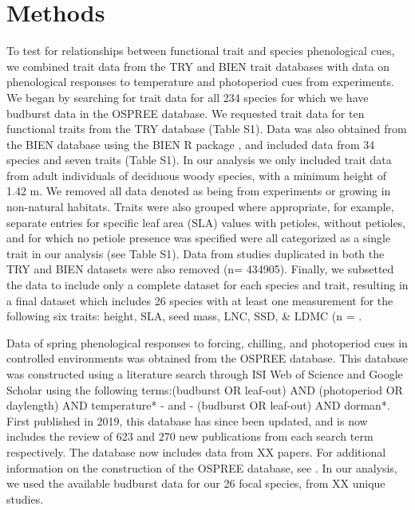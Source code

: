\documentclass{article}\usepackage[]{graphicx}\usepackage[]{color}
\begin{document}
\section{Methods}
To test for relationships between functional trait and species phenological cues, we combined trait data from the TRY and BIEN trait databases with data on phenological responses to temperature and photoperiod cues from experiments. We began by searching for trait data for all 234 species for which we have budburst data in the OSPREE database. We requested trait data for ten functional traits from the TRY database (Table S1). Data was also obtained from the BIEN database using the BIEN R package \citep{Maitner2017}, and included data from 34 species and seven traits (Table S1). In our analysis we only included trait data from adult individuals of deciduous woody species, with a minimum height of 1.42 m. We removed all data denoted as being from experiments or growing in non-natural habitats. Traits were also grouped where appropriate, for example, separate entries for specific leaf area (SLA) values with petioles, without petioles, and for which no petiole presence was specified were all categorized as a single trait in our analysis (see Table S1). Data from studies duplicated in both the TRY and BIEN datasets were also removed (n= 434905).  Finally, we subsetted the data to include only a complete dataset for each species and trait, resulting in a final dataset which includes 26 species with at least one measurement for the following six traits: height, SLA, seed mass, LNC, SSD, \& LDMC (n = . %

Data of spring phenological responses to forcing, chilling, and photoperiod cues in controlled environments was obtained from the OSPREE database. This database was constructed using a literature search through ISI Web of Science and Google Scholar using the following terms:(budburst OR leaf-out) AND (photoperiod OR daylength) AND temperature* - and - (budburst OR leaf-out) AND dorman*. First published in 2019, this database has since been updated, and is now includes the review of 623 and 270 new publications from each search term respectively. The database now includes data from XX papers. For additional information on the construction of the OSPREE database, see \citep{OSPREE}. In our analysis, we used the available budburst data for our 26 focal species, from XX unique studies. %
\end{document}
